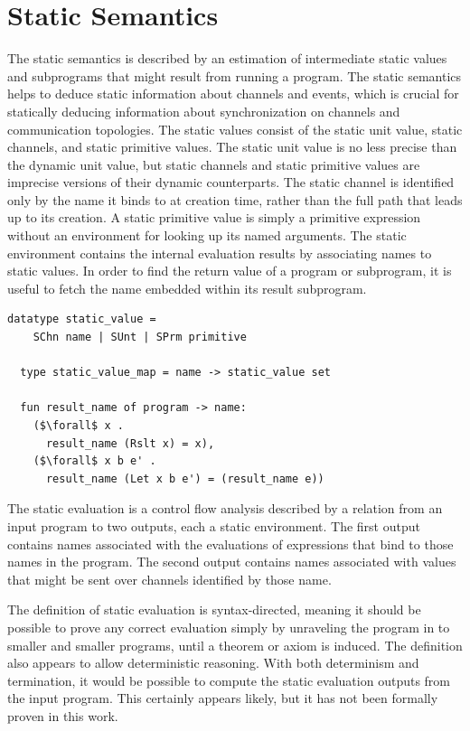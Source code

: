 \documentclass{article}
\begin{document}
\section{Static Semantics}
The static semantics is described by an estimation of intermediate static values and subprograms
that might result from running a program.    
The static semantics helps to deduce static information about channels and events, which is
crucial for statically deducing information about synchronization on channels and
communication topologies.
The static values consist of the static unit value, static channels, and static primitive
values. The static unit value is no less precise than the dynamic unit value, but
static channels and static primitive values are imprecise versions of their dynamic
counterparts. The static channel is identified only by the name it binds to at creation time,
rather than the full path that leads up to its creation.  A static primitive value is simply a
primitive expression without an environment for looking up its named arguments. The static
environment contains the internal evaluation results by associating names to static values.
In order to find the return value of a program or subprogram, it is useful to fetch the name
embedded within its result subprogram.

\begin{lstlisting}[language=logic, mathescape]
  datatype static_value =
    SChn name | SUnt | SPrm primitive 

  type static_value_map = name -> static_value set

  fun result_name of program -> name:
    ($\forall$ x .
      result_name (Rslt x) = x),
    ($\forall$ x b e' . 
      result_name (Let x b e') = (result_name e))
  \end{lstlisting}


The static evaluation is a control flow analysis described by a relation from an input program
to two outputs, each a static environment. The first output contains names associated with the
evaluations of expressions that bind to those names in the program. The second output contains
names associated with values that might be sent over channels identified by those name.

The definition of static evaluation is syntax-directed, meaning it should be possible to
prove any correct evaluation simply by unraveling the program in to smaller and smaller
programs, until a theorem or axiom is induced. The definition also appears to allow
deterministic reasoning. With both determinism and termination, it would be possible to compute
the static evaluation outputs from the input program. This certainly appears likely, but it has
not been formally proven in this work.
\end{document}
